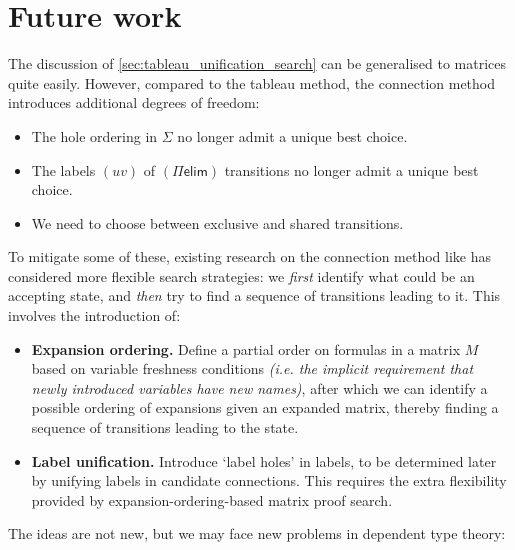 \documentclass[twoside]{report}
\begin{document}
\section{Future work}
\label{sec:matrix_unification_search}

The discussion of \cref{sec:tableau_unification_search} can be generalised to matrices quite easily. However, compared to the tableau method, the connection method introduces additional degrees of freedom:
\begin{itemize}[noitemsep]
    \item The hole ordering in $\Sigma$ no longer admit a unique best choice.
    \item The labels $(uv)$ of $(\Pi\mathsf{elim})$ transitions no longer admit a unique best choice.
    \item We need to choose between exclusive and shared transitions.
\end{itemize}
To mitigate some of these, existing research on the connection method like \cite{wallen1987automated} has considered more flexible search strategies: we \emph{first} identify what could be an accepting state, and \emph{then} try to find a sequence of transitions leading to it. This involves the introduction of:
\begin{itemize}
    \item \textbf{Expansion ordering.} Define a partial order on formulas in a matrix $M$ based on variable freshness conditions \emph{(i.e. the implicit requirement that newly introduced variables have new names)}, after which we can identify a possible ordering of expansions given an expanded matrix, thereby finding a sequence of transitions leading to the state.

    \item \textbf{Label unification.} Introduce `label holes' in labels, to be determined later by unifying labels in candidate connections. This requires the extra flexibility provided by expansion-ordering-based matrix proof search.
\end{itemize}
The ideas are not new, but we may face new problems in dependent type theory:
\end{document}
